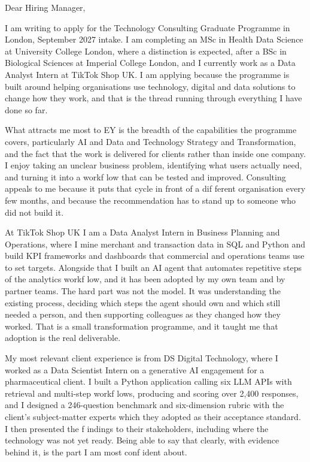 \documentclass[letterpaper,11pt]{article}
\begin{document}
Dear Hiring Manager,

I am writing to apply for the Technology Consulting Graduate Programme in London, September 2027 intake. I am completing an MSc in Health Data Science at University College London, where a distinction is expected, after a BSc in Biological Sciences at Imperial College London, and I currently work as a Data Analyst Intern at TikTok Shop UK. I am applying because the programme is built around helping organisations use technology, digital and data solutions to change how they work, and that is the thread running through everything I have done so far.

What attracts me most to EY is the breadth of the capabilities the programme covers, particularly AI and Data and Technology Strategy and Transformation, and the fact that the work is delivered for clients rather than inside one company. I enjoy taking an unclear business problem, identifying what users actually need, and turning it into a workf\kern0pt low that can be tested and improved. Consulting appeals to me because it puts that cycle in front of a dif\kern0pt ferent organisation every few months, and because the recommendation has to stand up to someone who did not build it.

At TikTok Shop UK I am a Data Analyst Intern in Business Planning and Operations, where I mine merchant and transaction data in SQL and Python and build KPI frameworks and dashboards that commercial and operations teams use to set targets. Alongside that I built an AI agent that automates repetitive steps of the analytics workf\kern0pt low, and it has been adopted by my own team and by partner teams. The hard part was not the model. It was understanding the existing process, deciding which steps the agent should own and which still needed a person, and then supporting colleagues as they changed how they worked. That is a small transformation programme, and it taught me that adoption is the real deliverable.

My most relevant client experience is from DS Digital Technology, where I worked as a Data Scientist Intern on a generative AI engagement for a pharmaceutical client. I built a Python application calling six LLM APIs with retrieval and multi-step workf\kern0pt lows, producing and scoring over 2,400 responses, and I designed a 246-question benchmark and six-dimension rubric with the client's subject-matter experts which they adopted as their acceptance standard. I then presented the f\kern0pt indings to their stakeholders, including where the technology was not yet ready. Being able to say that clearly, with evidence behind it, is the part I am most conf\kern0pt ident about.
\end{document}
